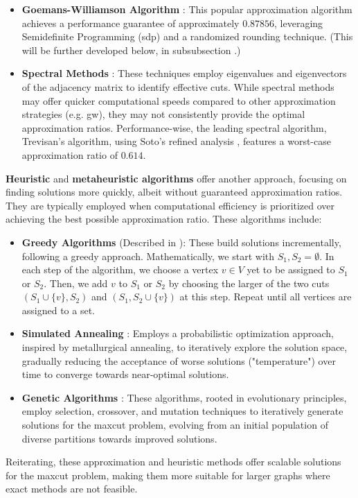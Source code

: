 \begin{itemize}
  \item \textbf{Goemans-Williamson Algorithm} \cite{GW-Algorithm}: This popular approximation algorithm achieves a performance guarantee of approximately $0.87856$, leveraging Semidefinite Programming (\acrshort{sdp}) and a randomized rounding technique. (This will be further developed below, in subsubsection .)
  \item \textbf{Spectral Methods} \cite{Spectral-MaxCut}: These techniques employ eigenvalues and eigenvectors of the adjacency matrix to identify effective cuts. While spectral methods may offer quicker computational speeds compared to other approximation strategies (e.g. \acrshort{gw}), they may not consistently provide the optimal approximation ratios. Performance-wise, the leading spectral algorithm, Trevisan's algorithm, using Soto's refined analysis \cite{Soto-MaxCut}, features a worst-case approximation ratio of $0.614$.
\end{itemize}

\textbf{Heuristic} and \textbf{metaheuristic algorithms} offer another approach, focusing on finding solutions more quickly, albeit without guaranteed approximation ratios. They are typically employed when computational efficiency is prioritized over achieving the best possible approximation ratio. These algorithms include:
\begin{itemize}
  \item \textbf{Greedy Algorithms} (Described in \cite{Spectral-MaxCut}): These build solutions incrementally, following a greedy approach. Mathematically, we start with $S_1, S_2 = \emptyset$. In each step of the algorithm, we choose a vertex $v \in V$ yet to be assigned to $S_1$ or $S_2$. Then, we add $v$ to $S_1$ or $S_2$ by choosing the larger of the two cuts $(S_1 \cup \{v\}, S_2)$ and $(S_1, S_2 \cup \{v\})$ at this step. Repeat until all vertices are assigned to a set.
  \item \textbf{Simulated Annealing} \cite{SA_MaxCut}: Employs a probabilistic optimization approach, inspired by metallurgical annealing, to iteratively explore the solution space, gradually reducing the acceptance of worse solutions ("temperature") over time to converge towards near-optimal solutions.
  \item \textbf{Genetic Algorithms} \cite{GA_MaxCut}: These algorithms, rooted in evolutionary principles, employ selection, crossover, and mutation techniques to iteratively generate solutions for the \acrshort{maxcut} problem, evolving from an initial population of diverse partitions towards improved solutions.
\end{itemize}
Reiterating, these approximation and heuristic methods offer scalable solutions for the \acrshort{maxcut} problem, making them more suitable for larger graphs where exact methods are not feasible.

